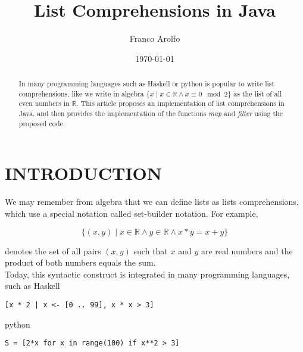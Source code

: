 \documentclass[%
 reprint,
 amsmath,amssymb,
 aps,
]{revtex4-1}
\begin{document}
\title{List Comprehensions in Java}%

\author{Franco Arolfo}

\date{\today}%

\begin{abstract}
In many programming languages such as Haskell or python is popular to write list comprehensions, like we write in algebra $\{x \mid x \in \mathbb{R} \wedge x \equiv 0 \mod 2 \}$ as the list of all even numbers in $\mathbb{R}$. This article proposes an implementation of list comprehensions in Java, and then provides the implementation of the functions \emph{map} and \emph{filter} using the proposed code.
\end{abstract}

\maketitle

\section{INTRODUCTION}

We may remember from algebra that we can define lists as lists comprehensions, which use a special notation called set-builder notation. For example,

	\[
		\{(x,y) \mid x \in \mathbb{R} \wedge y \in \mathbb{R} \wedge x * y = x + y\}
	\]

	denotes the set of all pairs \((x,y)\) such that $x$ and $y$ are real numbers and the product of both numbers equals the sum.\\

	Today, this syntactic construct is integrated in many programming languages, such as Haskell

	\begin{lstlisting}[frame=none]
[x * 2 | x <- [0 .. 99], x * x > 3]
	\end{lstlisting}

	python

	\begin{lstlisting}[frame=none]
S = [2*x for x in range(100) if x**2 > 3]
	\end{lstlisting}
\end{document}
